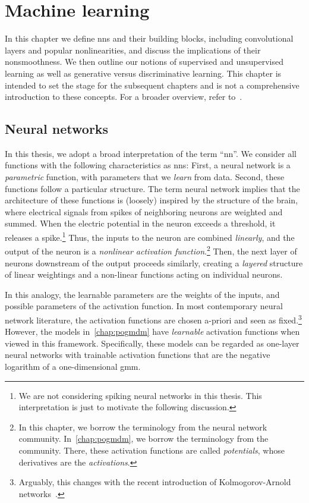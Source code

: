 \chapter{Machine learning}%
\label{chap:machine-learning}%
\graphicspath{{./chapters/machine-learning/scripts}}%
In this chapter we define \glspl{nn} and their building blocks, including convolutional layers and popular nonlinearities, and discuss the implications of their nonsmoothness.
We then outline our notions of supervised and unsupervised learning as well as generative versus discriminative learning.
This chapter is intended to set the stage for the subsequent chapters and is not a comprehensive introduction to these concepts.
For a broader overview, refer to~\cite{bishop_pattern_2006}.
\section{Neural networks}%
\label{sec:neural networks}
In this thesis, we adopt a broad interpretation of the term \enquote{\gls{nn}}.
We consider all functions with the following characteristics as \glspl{nn}:
First, a neural network is a \emph{parametric} function, with parameters that we \emph{learn} from data.
Second, these functions follow a particular structure.
The term neural network implies that the architecture of these functions is (loosely) inspired by the structure of the brain, where electrical signals from spikes of neighboring neurons are weighted and summed.
When the electric potential in the neuron exceeds a threshold, it releases a spike.\footnote{%
	We are not considering spiking neural networks in this thesis.
	This interpretation is just to motivate the following discussion.
}
Thus, the inputs to the neuron are combined \emph{linearly}, and the output of the neuron is a \emph{nonlinear activation function}.\footnote{%
	In this chapter, we borrow the terminology from the neural network community.
	In~\cref{chap:pogmdm}, we borrow the terminology from the  community.
	There, these activation functions are called \emph{potentials}, whose derivatives are the \emph{activations}.
}
Then, the next layer of neurons downstream of the output proceeds similarly, creating a \emph{layered} structure of linear weightings and a non-linear functions acting on individual neurons.

In this analogy, the learnable parameters are the weights of the inputs, and possible parameters of the activation function.
In most contemporary neural network literature, the activation functions are chosen a-priori and seen as fixed.\footnote{%
	Arguably, this changes with the recent introduction of Kolmogorov-Arnold networks~\cite{liu2024kan}.
}
However, the models in~\cref{chap:pogmdm} have \emph{learnable} activation functions when viewed in this framework.
Specifically, these models can be regarded as one-layer neural networks with trainable activation functions that are the negative logarithm of a one-dimensional \gls{gmm}.

